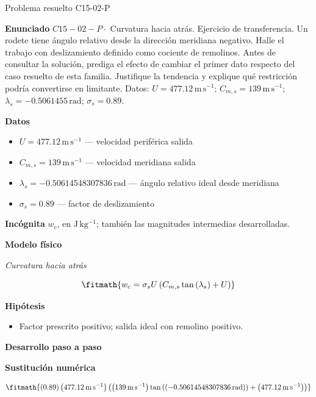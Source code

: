 \documentclass[10pt,openany]{book}
\begin{document}
\begin{studiumworked}{Problema resuelto C15-02-P}


\noindent\textbf{Enunciado}
\(C15-02-P \cdot\) Curvatura hacia atrás. Ejercicio de transferencia. Un rodete tiene ángulo relativo desde la dirección meridiana negativo. Halle el trabajo con deslizamiento definido como cociente de remolinos. Antes de consultar la solución, prediga el efecto de cambiar el primer dato respecto del caso resuelto de esta familia. Justifique la tendencia y explique qué restricción podría convertirse en limitante. Datos: \(U=477.12\, \mathrm{m}\,\mathrm{s}^{-1}\); \(C_{m,s}=139\, \mathrm{m}\,\mathrm{s}^{-1}\); \(\lambda_s=-0.5061455\, \mathrm{rad}\); \(\sigma_s=0.89\).

\noindent\textbf{Datos}
\begin{itemize}
\item $U = 477.12\,\mathrm{m}\,\mathrm{s}^{-1}$ — velocidad periférica salida
\item $C_{m,s} = 139\,\mathrm{m}\,\mathrm{s}^{-1}$ — velocidad meridiana salida
\item $\lambda_s = -0.50614548307836\,\mathrm{rad}$ — ángulo relativo ideal desde meridiana
\item $\sigma_s = 0.89$ — factor de deslizamiento
\end{itemize}

\noindent\textbf{Incógnita}
$w_c$, en $\mathrm{J\,kg^{-1}}$; también las magnitudes intermedias desarrolladas.

\noindent\textbf{Modelo físico}

\noindent\textit{Curvatura hacia atrás}

\[
\fitmath{w_c=\sigma_s U \left(C_{m,s} \tan{\left(\lambda_s \right)} + U\right)}
\]

\noindent\textbf{Hipótesis}
\begin{itemize}
\item Factor prescrito positivo; salida ideal con remolino positivo.
\end{itemize}

\noindent\textbf{Desarrollo paso a paso}



\noindent\textbf{Sustitución numérica}

\[
\fitmath{\left(0.89\right) \left(477.12\,\mathrm{m}\,\mathrm{s}^{-1}\right) \left(\left(139\,\mathrm{m}\,\mathrm{s}^{-1}\right) \tan{\left(\left(-0.50614548307836\,\mathrm{rad}\right) \right)} + \left(477.12\,\mathrm{m}\,\mathrm{s}^{-1}\right)\right)}
\]


\end{studiumworked}
\end{document}
